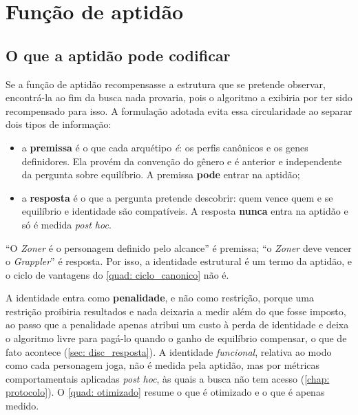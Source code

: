 \section{Função de aptidão}
\label{sec: aptidao}

\subsection{O que a aptidão pode codificar}
\label{sub: premissa}

Se a função de aptidão recompensasse a estrutura que se pretende observar, encontrá-la ao fim da busca nada provaria, pois o algoritmo a exibiria por ter sido recompensado para isso. A formulação adotada evita essa circularidade ao separar dois tipos de informação:

\begin{itemize}
    \item a \textbf{premissa} é o que cada arquétipo \textit{é}: os perfis canônicos e os genes definidores. Ela provém da convenção do gênero e é anterior e independente da pergunta sobre equilíbrio. A premissa \textbf{pode} entrar na aptidão;
    \item a \textbf{resposta} é o que a pergunta pretende descobrir: quem vence quem e se equilíbrio e identidade são compatíveis. A resposta \textbf{nunca} entra na aptidão e só é medida \textit{post hoc}.
\end{itemize}

``O \textit{Zoner} é o personagem definido pelo alcance'' é premissa; ``o \textit{Zoner} deve vencer o \textit{Grappler}'' é resposta. Por isso, a identidade estrutural é um termo da aptidão, e o ciclo de vantagens do \autoref{quad: ciclo_canonico} não é.

A identidade entra como \textbf{penalidade}, e não como restrição, porque uma restrição proibiria resultados e nada deixaria a medir além do que fosse imposto, ao passo que a penalidade apenas atribui um custo à perda de identidade e deixa o algoritmo livre para pagá-lo quando o ganho de equilíbrio compensar, o que de fato acontece (\autoref{sec: disc_resposta}). A identidade \textit{funcional}, relativa ao modo como cada personagem joga, não é medida pela aptidão, mas por métricas comportamentais aplicadas \textit{post hoc}, às quais a busca não tem acesso (\autoref{chap: protocolo}). O \autoref{quad: otimizado} resume o que é otimizado e o que é apenas medido.

